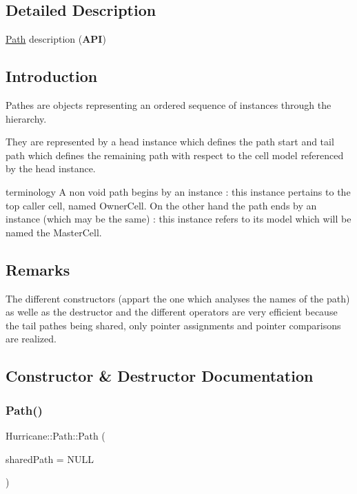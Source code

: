 \subsection{Detailed Description}
\hyperlink{classHurricane_1_1Path}{Path} description ({\bfseries A\+PI}) 

\hypertarget{classHurricane_1_1Path_secPathIntro}{}\subsection{Introduction}\label{classHurricane_1_1Path_secPathIntro}
Pathes are objects representing an ordered sequence of instances through the hierarchy.

They are represented by a head instance which defines the path start and tail path which defines the remaining path with respect to the cell model referenced by the head instance.

terminology A non void path begins by an instance \+: this instance pertains to the top caller cell, named Owner\+Cell. On the other hand the path ends by an instance (which may be the same) \+: this instance refers to its model which will be named the Master\+Cell.\hypertarget{classHurricane_1_1Path_secPathRemarks}{}\subsection{Remarks}\label{classHurricane_1_1Path_secPathRemarks}
The different constructors (appart the one which analyses the names of the path) as welle as the destructor and the different operators are very efficient because the tail pathes being shared, only pointer assignments and pointer comparisons are realized. 

\subsection{Constructor \& Destructor Documentation}
\mbox{\label{classHurricane_1_1Path_ad3fe735dcb2ce630f89b98c039663c23}} 
\subsubsection{\texorpdfstring{Path()}{Path()}\hspace{0.1cm}{\footnotesize\ttfamily [1/6]}}
{\footnotesize\ttfamily Hurricane\+::\+Path\+::\+Path (\begin{DoxyParamCaption}\item[{Shared\+Path $\ast$}]{shared\+Path = {\ttfamily NULL} }\end{DoxyParamCaption})}

